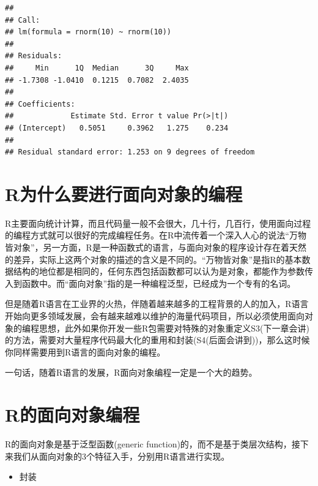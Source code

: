 \documentclass[]{book}
\providecommand{\tightlist}{%
  \setlength{\itemsep}{0pt}\setlength{\parskip}{0pt}}
\begin{document}
\begin{verbatim}
## 
## Call:
## lm(formula = rnorm(10) ~ rnorm(10))
## 
## Residuals:
##     Min      1Q  Median      3Q     Max 
## -1.7308 -1.0410  0.1215  0.7082  2.4035 
## 
## Coefficients:
##             Estimate Std. Error t value Pr(>|t|)
## (Intercept)   0.5051     0.3962   1.275    0.234
## 
## Residual standard error: 1.253 on 9 degrees of freedom
\end{verbatim}

\section{R为什么要进行面向对象的编程}\label{r}

R主要面向统计计算，而且代码量一般不会很大，几十行，几百行，使用面向过程的编程方式就可以很好的完成编程任务。在R中流传着一个深入人心的说法``万物皆对象''，另一方面，R是一种函数式的语言，与面向对象的程序设计存在着天然的差异，实际上这两个对象的描述的含义是不同的。``万物皆对象''是指R的基本数据结构的地位都是相同的，任何东西包括函数都可以认为是对象，都能作为参数传入到函数中。而``面向对象''指的是一种编程泛型，已经成为一个专有的名词。

但是随着R语言在工业界的火热，伴随着越来越多的工程背景的人的加入，R语言开始向更多领域发展，会有越来越难以维护的海量代码项目，所以必须使用面向对象的编程思想，此外如果你开发一些R包需要对特殊的对象重定义S3(下一章会讲)的方法，需要对大量程序代码最大化的重用和封装(S4(后面会讲到))，那么这时候你同样需要用到R语言的面向对象的编程。

一句话，随着R语言的发展，R面向对象编程一定是一个大的趋势。

\section{R的面向对象编程}\label{r}

R的面向对象是基于泛型函数(generic
function)的，而不是基于类层次结构，接下来我们从面向对象的3个特征入手，分别用R语言进行实现。

\begin{itemize}
\tightlist
\item
  封装
\end{itemize}
\end{document}
